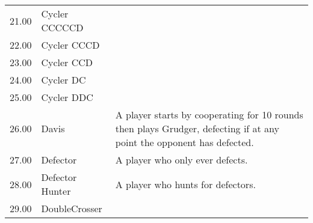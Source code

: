 \begin{tabular}{rll}
	21.00  & Cycler CCCCCD               &                                                                                                                                   \\
	22.00  & Cycler CCCD                 &                                                                                                                                   \\
	23.00  & Cycler CCD                  &                                                                                                                                   \\
	24.00  & Cycler DC                   &                                                                                                                                   \\
	25.00  & Cycler DDC                  &                                                                                                                                   \\
	26.00  & Davis                       & A player starts by cooperating for 10 rounds then plays Grudger,
	defecting if at any point the opponent has defected.                                                                                                                                                                                                                                                                                                                                                                                                                                                                                                                                                                                                                                                                                                                                                                                                                                                                                                \\
	27.00  & Defector                    & A player who only ever defects.                                                                                                   \\
	28.00  & Defector Hunter             & A player who hunts for defectors.                                                                                                 \\
	29.00  & DoubleCrosser               &                                                                                                                                   \\

\end{tabular}
